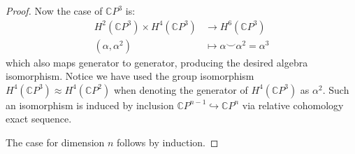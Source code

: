 \documentclass{article}
\numberwithin{equation}{section}
\newcommand{\C}{\mathbb{C}}
\begin{document}
\begin{proof}
	Now the case of $\C P^3$ is:
	\begin{align*}
		H^2(\C P^3)\times H^4(\C P^3)&\to H^6(\C P^3)\\
		(\alpha,\alpha^2)\qquad\quad&\mapsto\alpha\smile\alpha^2=\alpha^3
	\end{align*}
	which also  maps generator to generator, producing the desired algebra isomorphism. Notice we have used the group isomorphism $H^4(\C P^3)\approx H^4(\C P^2)$ when denoting the generator of $H^4(\C P^3)$ as $\alpha^2$. Such an isomorphism is induced by inclusion $\C P^{n-1}\hookrightarrow\C P^n$ via relative cohomology exact sequence.
	
	The case for dimension $n$ follows by induction.
\end{proof}
\end{document}
